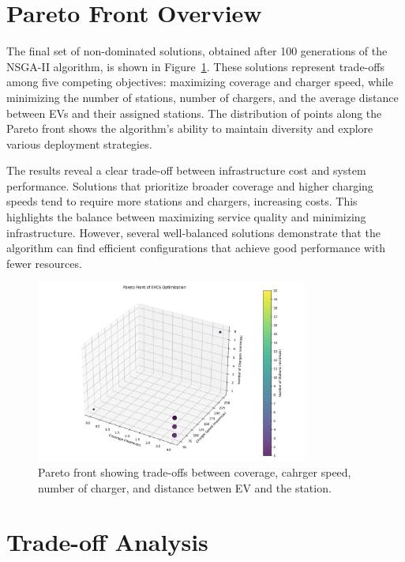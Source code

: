 \section{Pareto Front Overview}

The final set of non-dominated solutions, obtained after 100 generations of the NSGA-II algorithm, is shown in Figure~\ref{fig:pareto_front}. These solutions represent trade-offs among five competing objectives: maximizing coverage and charger speed, while minimizing the number of stations, number of chargers, and the average distance between EVs and their assigned stations. The distribution of points along the Pareto front shows the algorithm’s ability to maintain diversity and explore various deployment strategies.

The results reveal a clear trade-off between infrastructure cost and system performance. Solutions that prioritize broader coverage and higher charging speeds tend to require more stations and chargers, increasing costs. This highlights the balance between maximizing service quality and minimizing infrastructure. However, several well-balanced solutions demonstrate that the algorithm can find efficient configurations that achieve good performance with fewer resources.



\clearpage

\begin{figure}[h!]
    \centering
    \includegraphics[width=0.8\textwidth]{../Figures/Pareto_front.png}
    \caption{Pareto front showing trade-offs between coverage, cahrger speed, number of charger, and distance betwen EV and the station.}
    \label{fig:pareto_front}
\end{figure}

\section{Trade-off Analysis}

